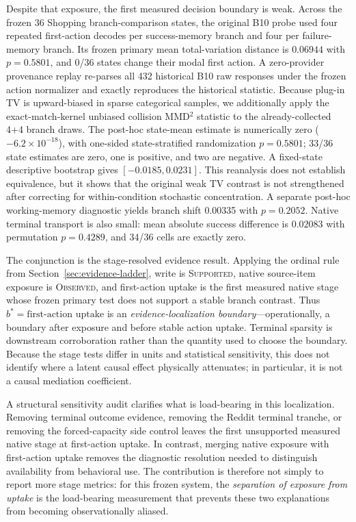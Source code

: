 Despite that exposure, the first measured decision boundary is weak. Across the frozen 36 Shopping branch-comparison states, the original B10 probe used four repeated first-action decodes per success-memory branch and four per failure-memory branch. Its frozen primary mean total-variation distance is $0.06944$ with $p=0.5801$, and 0/36 states change their modal first action. A zero-provider provenance replay re-parses all 432 historical B10 raw responses under the frozen action normalizer and exactly reproduces the historical statistic. Because plug-in TV is upward-biased in sparse categorical samples, we additionally apply the exact-match-kernel unbiased collision MMD$^2$ statistic to the already-collected 4+4 branch draws. The post-hoc state-mean estimate is numerically zero ($-6.2\times10^{-18}$), with one-sided state-stratified randomization $p=0.5801$; 33/36 state estimates are zero, one is positive, and two are negative. A fixed-state descriptive bootstrap gives $[-0.0185,0.0231]$. This reanalysis does not establish equivalence, but it shows that the original weak TV contrast is not strengthened after correcting for within-condition stochastic concentration. A separate post-hoc working-memory diagnostic yields branch shift 0.00335 with $p=0.2052$. Native terminal transport is also small: mean absolute success difference is $0.02083$ with permutation $p=0.4289$, and 34/36 cells are exactly zero.

The conjunction is the stage-resolved evidence result. Applying the ordinal rule from Section~\ref{sec:evidence-ladder}, write is \textsc{Supported}, native source-item exposure is \textsc{Observed}, and first-action uptake is the first measured native stage whose frozen primary test does not support a stable branch contrast. Thus $b^*=\text{first-action uptake}$ is an \emph{evidence-localization boundary}---operationally, a boundary after exposure and before stable action uptake. Terminal sparsity is downstream corroboration rather than the quantity used to choose the boundary. Because the stage tests differ in units and statistical sensitivity, this does not identify where a latent causal effect physically attenuates; in particular, it is not a causal mediation coefficient.

A structural sensitivity audit clarifies what is load-bearing in this localization. Removing terminal outcome evidence, removing the Reddit terminal tranche, or removing the forced-capacity side control leaves the first unsupported measured native stage at first-action uptake. In contrast, merging native exposure with first-action uptake removes the diagnostic resolution needed to distinguish availability from behavioral use. The contribution is therefore not simply to report more stage metrics: for this frozen system, the \emph{separation of exposure from uptake} is the load-bearing measurement that prevents these two explanations from becoming observationally aliased.

